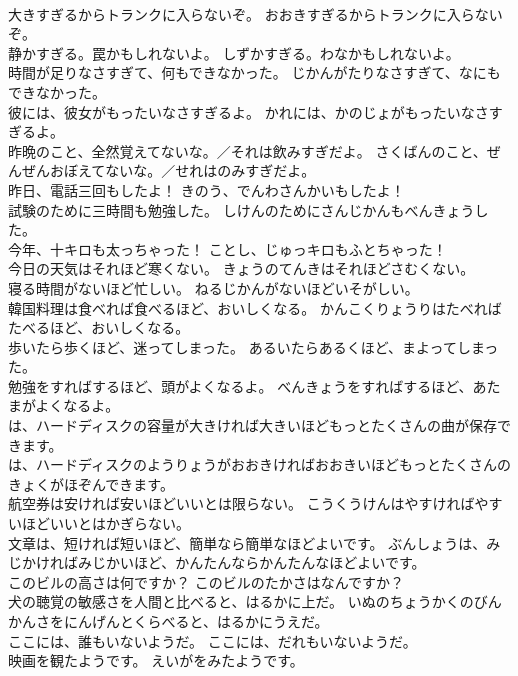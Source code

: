 \documentclass[8pt]{extreport}
\begin{document}
\begin{CJK}{UTF8}{min}
\\	大きすぎるからトランクに入らないぞ。	おおきすぎるからトランクに入らないぞ。 
\\	静かすぎる。罠かもしれないよ。	しずかすぎる。わなかもしれないよ。 
\\	時間が足りなさすぎて、何もできなかった。	じかんがたりなさすぎて、なにもできなかった。 
\\	彼には、彼女がもったいなさすぎるよ。	かれには、かのじょがもったいなさすぎるよ。 
\\	昨晩のこと、全然覚えてないな。／それは飲みすぎだよ。	さくばんのこと、ぜんぜんおぼえてないな。／せれはのみすぎだよ。 
\\	昨日、電話三回もしたよ！	きのう、でんわさんかいもしたよ！ 
\\	試験のために三時間も勉強した。	しけんのためにさんじかんもべんきょうした。 
\\	今年、十キロも太っちゃった！	ことし、じゅっキロもふとちゃった！ 
\\	今日の天気はそれほど寒くない。	きょうのてんきはそれほどさむくない。 
\\	寝る時間がないほど忙しい。	ねるじかんがないほどいそがしい。 
\\	韓国料理は食べれば食べるほど、おいしくなる。	かんこくりょうりはたべればたべるほど、おいしくなる。 
\\	歩いたら歩くほど、迷ってしまった。	あるいたらあるくほど、まよってしまった。 
\\	勉強をすればするほど、頭がよくなるよ。	べんきょうをすればするほど、あたまがよくなるよ。 
\\	は、ハードディスクの容量が大きければ大きいほどもっとたくさんの曲が保存できます。	
\\	は、ハードディスクのようりょうがおおきければおおきいほどもっとたくさんのきょくがほぞんできます。 
\\	航空券は安ければ安いほどいいとは限らない。	こうくうけんはやすければやすいほどいいとはかぎらない。 
\\	文章は、短ければ短いほど、簡単なら簡単なほどよいです。	ぶんしょうは、みじかければみじかいほど、かんたんならかんたんなほどよいです。 
\\	このビルの高さは何ですか？	このビルのたかさはなんですか？ 
\\	犬の聴覚の敏感さを人間と比べると、はるかに上だ。	いぬのちょうかくのびんかんさをにんげんとくらべると、はるかにうえだ。 
\\	ここには、誰もいないようだ。	ここには、だれもいないようだ。 
\\	映画を観たようです。	えいがをみたようです。 

\end{CJK}
\end{document}
